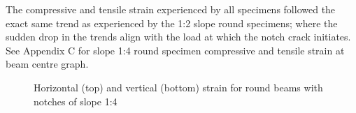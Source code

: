 \documentclass[11pt,a4paper]{article}
\numberwithin{equation}{subsection}
\begin{document}
\vspace*{\baselineskip}
\noindent
The compressive and tensile strain experienced by all specimens followed the exact same trend as experienced by the 1:2 slope round specimens; where the sudden drop in the trends align with the load at which the notch crack initiates. See Appendix C for slope 1:4 round specimen compressive and tensile strain at beam centre graph.

\begin{figure}[h]
	\begin{center}
	\end{center}
	\caption{Horizontal (top) and vertical (bottom) strain for round beams with notches of slope 1:4}
	\label{fig:Round_14_ZY}
\end{figure}
\end{document}
